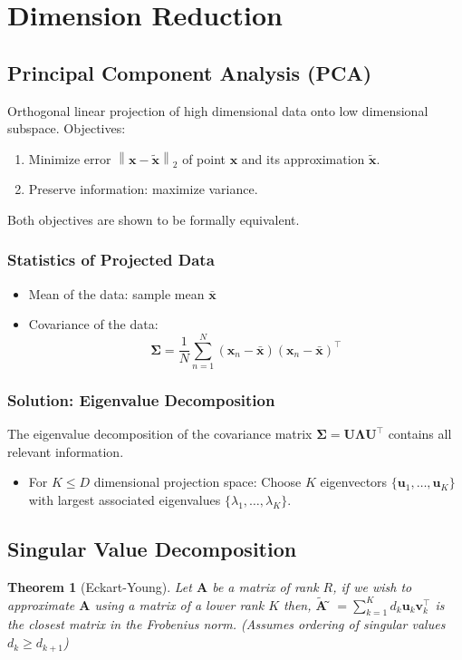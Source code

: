 \documentclass[conference,11pt]{IEEEtran}
\newtheorem*{thm}{Theorem}
\newcommand{\norm}[1]{\left\lVert#1\right\rVert}
\newcommand{\matr}[1]{\boldsymbol{\mathbf{#1}}}
\newcommand{\vect}[1]{\boldsymbol{\mathbf{#1}}}
\newcommand{\trns}[1]{#1^{\top}}
\begin{document}
\section{Dimension Reduction}
\subsection{Principal Component Analysis (PCA)}
Orthogonal linear projection of high dimensional data onto low
dimensional subspace. Objectives:
\begin{enumerate}
  \item Minimize error $\norm{\vect{x} - \tilde{\vect{x}}}_2$ of
    point $\vect{x}$ and its approximation $\tilde{\vect{x}}$.
  \item Preserve information: maximize variance.
\end{enumerate}
Both objectives are shown to be formally equivalent.
\subsubsection{Statistics of Projected Data}
\begin{itemize}
  \item Mean of the data: sample mean $\bar{\vect{x}}$
  \item Covariance of the data:
    \[
      \matr{\Sigma} = \frac{1}{N} \sum_{n=1}^N (\vect{x}_n -
      \bar{\vect{x}}) \trns{(\vect{x}_n - \bar{\vect{x}})}
    \]
\end{itemize}
\subsubsection{Solution: Eigenvalue Decomposition}
The eigenvalue decomposition of the covariance matrix
$\matr{\Sigma} = \matr{U}\matr{\Lambda}\trns{\matr{U}}$ contains
all relevant information.
\begin{itemize}
  \item For $K \leq D$ dimensional projection space: Choose $K$
    eigenvectors $\{\vect{u}_1, \ldots, \vect{u}_K\}$ with largest
    associated eigenvalues $\{\lambda_1, \ldots, \lambda_K\}$.
\end{itemize}

\subsection{Singular Value Decomposition}
\begin{thm}[Eckart-Young]
  Let $\matr{A}$ be a matrix of rank $R$, if we wish to
  approximate $\matr{A}$ using a matrix of a lower rank $K$
  then, $\tilde{\matr{A}} ̃= \sum_{k=1}^K d_k \vect{u}_k
  \trns{\vect{v}_k}$ is the closest matrix in the Frobenius norm.
  (Assumes ordering of singular values $d_k \geq d_{k+1}$)
\end{thm}
\end{document}
